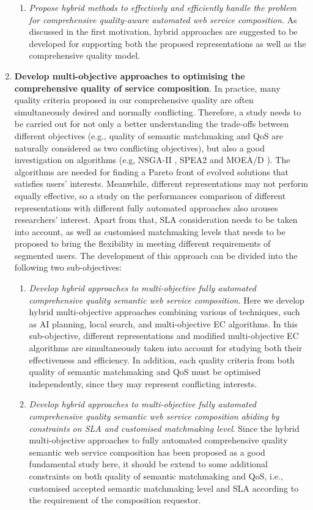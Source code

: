 \begin{enumerate}
\begin{enumerate}
    \item \emph{Propose hybrid methods to effectively and efficiently handle the problem for comprehensive quality-aware automated web service composition.} As discussed in the first motivation, hybrid approaches are suggested to be developed for supporting both the proposed representations as well as the comprehensive quality model. 
  \end{enumerate}
 
 \item \textbf{Develop multi-objective approaches to optimising the comprehensive quality of service composition}. In practice, many quality criteria proposed in our comprehensive quality are often simultaneously desired and normally conflicting. Therefore, a study needs to be carried out for not only a better understanding the trade-offs between different objectives (e.g., quality of semantic matchmaking and QoS are naturally considered as two conflicting objectives), but also a good investigation on algorithms (e.g, NSGA-II \cite{deb2002fast}, SPEA2 \cite{zitzler2001spea2} and MOEA/D \cite{zhang2007moea}). The algorithms are needed for finding a Pareto front of evolved solutions that satisfies users' interests. Meanwhile, different representations may not perform equally effective, so a study on the performances comparison of different representations with different fully automated approaches also arouses researchers' interest. Apart from that, SLA consideration needs to be taken into account, as well as customised matchmaking levels that needs to be proposed to bring the flexibility in meeting different requirements of segmented users. The development of this approach can be divided into the following two sub-objectives:
   \begin{enumerate}
    \item \emph{Develop hybrid approaches to multi-objective fully automated comprehensive quality semantic web service composition}. Here we develop hybrid multi-objective approaches combining various of techniques, such as AI planning, local search, and multi-objective EC algorithms. In this sub-objective, different representations and modified multi-objective EC algorithms are simultaneously taken into account for studying both their effectiveness and efficiency. In addition, each quality criteria from both quality of semantic matchmaking and QoS must be optimised independently, since they may represent conflicting interests.

    \item \emph{Develop hybrid approaches to multi-objective fully automated comprehensive quality semantic web service composition abiding by constraints on SLA and customised matchmaking level}. Since the hybrid multi-objective approaches to fully automated comprehensive quality semantic web service composition has been proposed as a good fundamental study here, it should be extend to some additional constraints on both quality of semantic matchmaking and QoS, i.e., customised accepted semantic matchmaking level and SLA according to the requirement of the composition requestor.
   \end{enumerate}
  

\end{enumerate}
